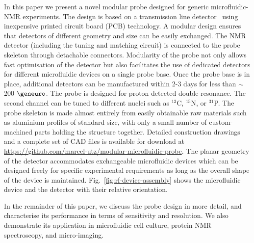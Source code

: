 \documentclass[preprint,5p]{elsarticle}
\newcommand{\fig}[1]{Fig.~\ref{#1}}
\begin{document}
In this paper we present a novel modular probe designed for generic
microfluidic-NMR experiments. The design is based on a transmission line
detector~\cite{stripline_jan,gream_2016} using inexpensive
printed circuit board (PCB) technology. A modular design ensures that detectors of
different geometry and size can be easily exchanged.
The NMR detector (including the tuning and matching circuit) is connected to the probe
skeleton through detachable connectors. Modularity of the probe not only allows
fast optimisation of the detector but also facilitates the use of dedicated detectors
for different microfluidic devices on a single probe base.
Once the probe base is in place, additional detectors can be manufactured
within 2-3 days for less than $\sim$200 $\geneuro$.
The probe is designed for proton detected double resonance.
The second channel can be tuned to different nuclei such as $^{13}$C, $^{15}$N, or
$^{31}$P. The probe skeleton is made almost entirely from easily obtainable raw materials
such as aluminium profiles of standard size, with only a small number of
custom-machined parts holding the structure together.
Detailed construction drawings and a complete set of CAD files is
available for download at \url{https://github.com/marcel-utz/modular-microfluidic-probe}.
The planar geometry of the detector accommodates exchangeable microfluidic devices
which can be designed freely for specific experimental requirements as long as the
overall shape of the device is maintained. \fig{fig:rf-device-assembly} shows the microfluidic device and the detector with their relative orientation.

In the remainder of this paper, we discuss the probe design in more detail,
and characterise its performance in terms of sensitivity and resolution.
We also demonstrate its application in microfluidic cell culture,
protein NMR spectroscopy, and micro-imaging.
\end{document}
